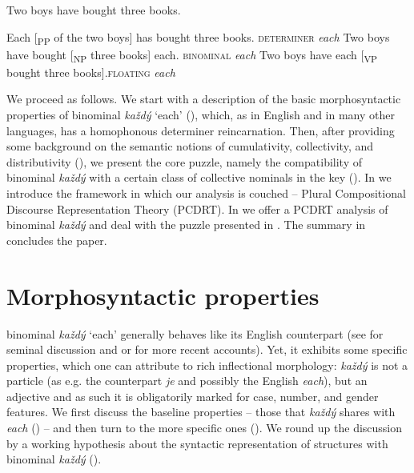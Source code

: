 \documentclass[output=paper,colorlinks,citecolor=brown,newtxmath]{langscibook}
\begin{document}
\ea \label{ex:line41} Two boys have bought three books.
\z

\ea \ea Each [\textsubscript{PP} of the two boys] has bought three books. \label{ex:sec1-two-boys-three-books}
\hfill \textsc{determiner} \textit{each}
\ex \label{ex:two_boys_each} Two boys have bought [\textsubscript{NP} three books]
each.\label{ex:sec1-two-boys-three-beers-each} \hfill \textsc{binominal} \textit{each}
\ex \label{ex:adv-each} Two boys have each [\textsubscript{VP} bought three books].\hfill\textsc{floating} \textit{each}
\z\z

\noindent We proceed as follows. We start with a description of the basic morphosyntactic properties of  binominal \textit{každý} `each' (), which, as in English and in many other languages, has a homophonous determiner reincarnation. Then, after providing some background on the semantic notions of cumulativity, collectivity, and distributivity (), we present the core puzzle, namely the compatibility of binominal \textit{každý} with a certain class of collective nominals in the key (). In  we introduce the framework in which our analysis is couched -- Plural Compositional Discourse Representation Theory (PCDRT). In  we offer a PCDRT analysis of binominal \textit{každý} and deal with the puzzle presented in . The summary in  concludes the paper.


\section{Morphosyntactic properties}\label{basic-properties-of-czech-binominal-each-i}

 binominal \textit{každý} `each' generally behaves like its English counterpart (see \citealt{Safir1988} for seminal discussion and \citealt{Zimmermann2002} or \citealt{Dotlacil2012} for more recent accounts). Yet, it exhibits some specific properties, which one can attribute to rich inflectional morphology: \textit{každý} is not a particle (as e.g. the  counterpart \textit{je} and possibly the English \textit{each}), but an adjective and as such it is obligatorily marked for case, number, and gender features. We first discuss the baseline properties -- those that \textit{každý} shares with \textit{each} () -- and then turn to the more specific ones (). We round up the discussion by a working hypothesis about the syntactic representation of structures with binominal \textit{každý} ().
\end{document}
